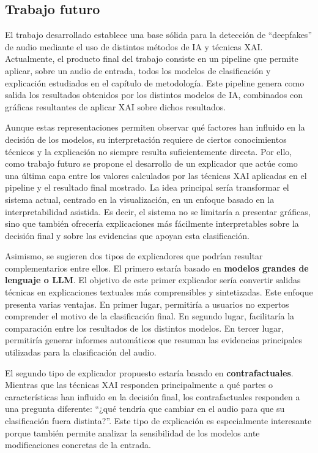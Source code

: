 \subsection{Trabajo futuro}

El trabajo desarrollado establece una base sólida para la detección de ``deepfakes'' de audio mediante el uso de distintos métodos de IA y técnicas XAI. 
Actualmente, el producto final del trabajo consiste en un pipeline que permite aplicar, sobre un audio de entrada, todos los modelos de clasificación y explicación estudiados en el capítulo de metodología. Este pipeline genera como salida los resultados obtenidos por los distintos modelos de IA, combinados con gráficas resultantes de aplicar XAI sobre dichos resultados.

Aunque estas representaciones permiten observar qué factores han influido en la decisión de los modelos, su interpretación requiere de ciertos conocimientos técnicos y la explicación no siempre resulta suficientemente directa. Por ello, como trabajo futuro se propone el desarrollo de un explicador que actúe como una última capa entre los valores calculados por las técnicas XAI aplicadas en el pipeline y el resultado final mostrado.
La idea principal sería transformar el sistema actual, centrado en la visualización, en un enfoque basado en la interpretabilidad asistida. Es decir, el sistema no se limitaría a presentar gráficas, sino que también ofrecería explicaciones más fácilmente interpretables sobre la decisión final y sobre las evidencias que apoyan esta clasificación.

Asimismo, se sugieren dos tipos de explicadores que podrían resultar complementarios entre ellos. El primero estaría basado en \textbf{modelos grandes de lenguaje o LLM}. El objetivo de este primer explicador sería convertir salidas técnicas en explicaciones textuales más comprensibles y sintetizadas. Este enfoque presenta varias ventajas. En primer lugar, permitiría a usuarios no expertos comprender el motivo de la clasificación final. En segundo lugar, facilitaría la comparación entre los resultados de los distintos modelos.
En tercer lugar, permitiría generar informes automáticos que resuman las evidencias principales utilizadas para la clasificación del audio.

El segundo tipo de explicador propuesto estaría basado en \textbf{contrafactuales}. Mientras que las técnicas XAI responden principalmente a qué partes o características han influido en la decisión final, los contrafactuales responden a una pregunta diferente: ``¿qué tendría que cambiar en el audio para que su clasificación fuera distinta?''.
Este tipo de explicación es especialmente interesante porque también permite analizar la sensibilidad de los modelos ante modificaciones concretas de la entrada.

